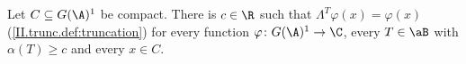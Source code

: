 Let $C\subseteq G(\A)^1$ be compact. There is $c\in\R$ such that $\Lambda^T\varphi(x)=\varphi(x)$ (\cref{II.trunc.def:truncation}) for every function
$\varphi\colon G(\A)^1\to\C$, every $T\in\aB$ with $\alpha(T)\ge c$ and every $x\in C$.
